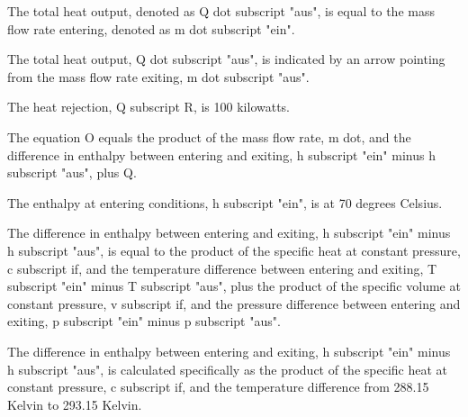 The total heat output, denoted as Q dot subscript "aus", is equal to the mass flow rate entering, denoted as m dot subscript "ein".

The total heat output, Q dot subscript "aus", is indicated by an arrow pointing from the mass flow rate exiting, m dot subscript "aus".

The heat rejection, Q subscript R, is 100 kilowatts.

The equation O equals the product of the mass flow rate, m dot, and the difference in enthalpy between entering and exiting, h subscript "ein" minus h subscript "aus", plus Q.

The enthalpy at entering conditions, h subscript "ein", is at 70 degrees Celsius.

The difference in enthalpy between entering and exiting, h subscript "ein" minus h subscript "aus", is equal to the product of the specific heat at constant pressure, c subscript if, and the temperature difference between entering and exiting, T subscript "ein" minus T subscript "aus", plus the product of the specific volume at constant pressure, v subscript if, and the pressure difference between entering and exiting, p subscript "ein" minus p subscript "aus".

The difference in enthalpy between entering and exiting, h subscript "ein" minus h subscript "aus", is calculated specifically as the product of the specific heat at constant pressure, c subscript if, and the temperature difference from 288.15 Kelvin to 293.15 Kelvin.